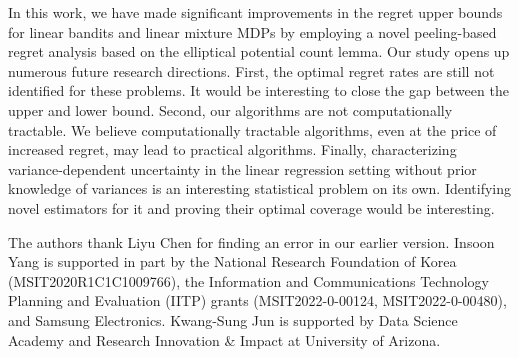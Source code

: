 \documentclass{article}
\begin{document}
In this work, we have made significant improvements in the regret upper bounds for linear bandits and linear mixture MDPs by employing a novel peeling-based regret analysis based on the elliptical potential count lemma. 
Our study opens up numerous future research directions.
First, the optimal regret rates are still not identified for these problems.  
It would be interesting to close the gap between the upper and lower bound.
Second, our algorithms are not computationally tractable.
We believe computationally tractable algorithms, even at the price of increased regret, may lead to practical algorithms.
Finally, characterizing variance-dependent uncertainty in the linear regression setting without prior knowledge of variances is an interesting statistical problem on its own.
Identifying novel estimators for it and proving their optimal coverage would be interesting.


\begin{ack}
The authors thank Liyu Chen for finding an error in our earlier version.
Insoon Yang is supported in part by the National Research Foundation of Korea (MSIT2020R1C1C1009766), the Information and Communications Technology Planning and Evaluation (IITP) grants (MSIT2022-0-00124, MSIT2022-0-00480), and Samsung Electronics.
Kwang-Sung Jun is supported by Data Science Academy and Research Innovation \& Impact
at University of Arizona.
\end{ack}









\end{document}
